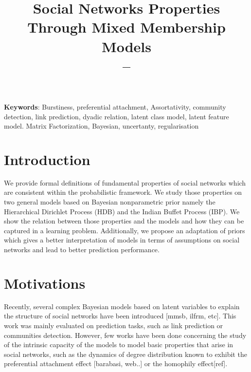 \documentclass[a4paper, 12pt]{article}
\title{
      \Large{Social Networks Properties Through Mixed Membership Models}\\
            --\\ }
\begin{document}
\maketitle


\textbf{Keywords}: Burstiness, preferential attachment, Assortativity, community detection, link prediction, dyadic relation, latent class model, latent feature model. Matrix Factorization, Bayesian, uncertanty, regularisation

\section{Introduction}

We provide formal definitions of fundamental properties of social networks which are consistent within the probabilistic framework. We study those properties on two general models based on Bayesian nonparametric prior namely the Hierarchical Dirichlet Process (HDB) and the Indian Buffet Process (IBP). We show the relation between those properties and the models and how they can be captured in a learning problem. Additionally, we propose an adaptation of priors which gives a better interpretation of models in terms of assumptions on social networks and lead to better prediction performance.


\section{Motivations}
Recently, several complex Bayesian models based on latent variables to explain the structure of social networks have been introduced [mmsb, ilfrm, etc]. This work was mainly evaluated on prediction tasks, such as link prediction or communities detection. However, few works have been done concerning the study of the intrinsic capacity of the models to model basic properties that arise in social networks, such as the dynamics of degree distribution known to exhibit the preferential attachment effect [barabasi, web..] or the homophily effect[ref].
~\\
\end{document}

